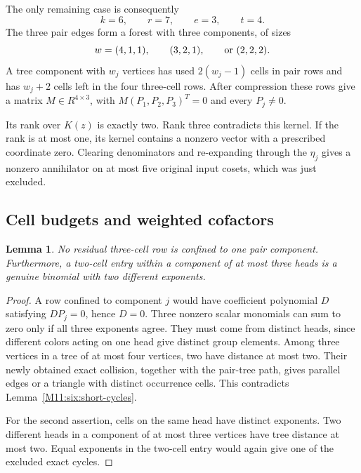 \documentclass[11pt,a4paper,oneside]{report}
\newtheorem{lemma}[theorem]{Lemma}
\theoremstyle{definition}
\theoremstyle{remark}
\begin{document}
The only remaining case is consequently
\begin{equation}\label{M11:six:remaining}
 k=6,\qquad r=7,\qquad e=3,\qquad t=4.
\end{equation}
The three pair edges form a forest with three components, of sizes
\begin{equation}\label{M11:six:weights}
 w=(4,1,1),\qquad (3,2,1),\qquad\hbox{or }(2,2,2).
\end{equation}
A tree component with \(w_j\) vertices has used \(2(w_j-1)\) cells in
pair rows and has \(w_j+2\) cells left in the four three-cell rows.
After compression these rows give a matrix \(M\in R^{4\times3}\),
with \(M(P_1,P_2,P_3)^T=0\) and every \(P_j\ne0\).

Its rank over \(K(z)\) is exactly two. Rank three contradicts this
kernel. If the rank is at most one, its kernel contains a nonzero
vector with a prescribed coordinate zero. Clearing denominators and
re-expanding through the \(\eta_j\) gives a nonzero annihilator on at
most five original input cosets, which was just excluded.

\subsection{Cell budgets and weighted cofactors}

\begin{lemma}\label{M11:six:binomials}
No residual three-cell row is confined to one pair component.
Furthermore, a two-cell entry within a component of at most three
heads is a genuine binomial with two different exponents.
\end{lemma}

\begin{proof}
A row confined to component \(j\) would have coefficient polynomial
\(D\) satisfying \(DP_j=0\), hence \(D=0\). Three nonzero scalar
monomials can sum to zero only if all three exponents agree. They must
come from distinct heads, since different colors acting on one head
give distinct group elements. Among three vertices in a tree of at
most four vertices, two have distance at most two. Their newly obtained
exact collision, together with the pair-tree path, gives parallel
edges or a triangle with distinct occurrence cells. This contradicts
Lemma~\ref{M11:six:short-cycles}.

For the second assertion, cells on the same head have distinct
exponents. Two different heads in a component of at most three
vertices have tree distance at most two. Equal exponents in the
two-cell entry would again give one of the excluded exact cycles.
\end{proof}
\end{document}

